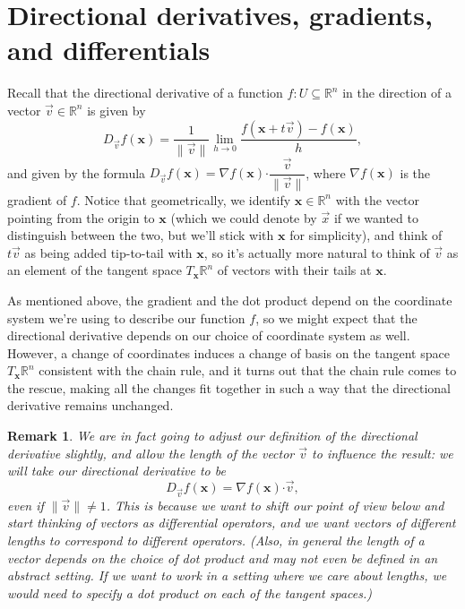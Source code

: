 \documentclass[12pt,letterpaper]{article}
\newtheorem{rem}[theorem]{Remark}
\newenvironment{remark}{\begin{rem}\rm}{\end{rem}}
\newcommand{\R}{\mathbb{R}}
\newcommand{\x}{\mathbf{x}}
\newcommand{\dotp}{\boldsymbol{\cdot}}
\begin{document}
\section{Directional derivatives, gradients, and differentials}
Recall that the directional derivative of a function $f:U\subseteq \R^n$ in the direction of a vector $\vec{v}\in\R^n$ is given by
\[
 D_{\vec{v}}f(\x) = \frac{1}{\lVert\vec{v}\rVert}\lim_{h\to 0} \frac{f(\x+t\vec{v})-f(\x)}{h},
\]
and given by the formula $D_{\vec{v}}f(\x) = \nabla f(\x)\dotp \dfrac{\vec{v}}{\lVert\vec{v}\rVert}$, where $\nabla f(\x)$ is the gradient of $f$. Notice that geometrically, we identify $\x\in\R^n$ with the vector pointing from the origin to $\x$ (which we could denote by $\vec{x}$ if we wanted to distinguish between the two, but we'll stick with $\x$ for simplicity), and think of $t\vec{v}$ as being added tip-to-tail with $\x$, so it's actually more natural to think of $\vec{v}$ as an element of the tangent space $T_{\x}\R^n$ of vectors with their tails at $\x$.

As mentioned above, the gradient and the dot product depend on the coordinate system we're using to describe our function $f$, so we might expect that the directional derivative depends on our choice of coordinate system as well. However, a change of coordinates induces a change of basis on the tangent space $T_{\x}\R^n$ consistent with the chain rule, and it turns out that the chain rule comes to the rescue, making all the changes fit together in such a way that the directional derivative remains unchanged.

\begin{remark}
We are in fact going to adjust our definition of the directional derivative slightly, and allow the length of the vector $\vec{v}$ to influence the result: we will take our directional derivative to be
\[
D_{\vec{v}}f(\x) = \nabla f(\x)\dotp \vec{v},
\]
even if $\lVert\vec{v}\rVert\neq 1$. This is because we want to shift our point of view below and start thinking of vectors as {\em differential operators}, and we want vectors of different lengths to correspond to different operators. (Also, in general the length of a vector depends on the choice of dot product and may not even be defined in an abstract setting. If we want to work in a setting where we care about lengths, we would need to specify a dot product on each of the tangent spaces.)
\end{remark}
\end{document}

